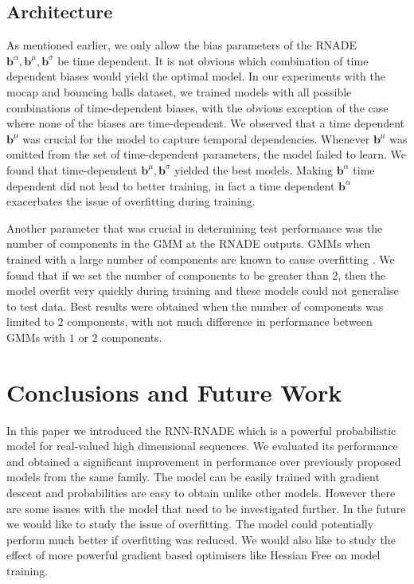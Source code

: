 \documentclass{article} %
\begin{document}
\subsection{Architecture}

As mentioned earlier, we only allow the bias parameters of the RNADE $\mathbf{b}^{\alpha},\mathbf{b}^{\mu},\mathbf{b}^{\sigma}$ be time dependent. It is not obvious which combination of time dependent biases would yield the optimal model. In our experiments with the mocap and bouncing balls dataset, we trained models with all possible combinations of time-dependent biases, with the obvious exception of the case where none of the biases are time-dependent. We observed that a time dependent $\mathbf{b}^{\mu}$ was crucial for the model to capture temporal dependencies. Whenever $\mathbf{b}^{\mu}$ was omitted from the set of time-dependent parameters, the model failed to learn. We found that time-dependent $\mathbf{b}^{\mu},\mathbf{b}^{\sigma}$ yielded the best models. Making $\mathbf{b}^{\alpha}$ time dependent did not lead to better training, in fact a time dependent $\mathbf{b}^{\alpha}$ exacerbates the issue of overfitting during training. 

Another parameter that was crucial in determining test performance was the number of components in the GMM at the RNADE outputs. GMMs when trained with a large number of components are known to cause overfitting \cite{bishop2006pattern}. We found that if we set the number of components to be greater than 2, then the model overfit very quickly during training and these models could not generalise to test data. Best results were obtained when the number of components was limited to $2$ components, with not much difference in performance between GMMs with $1$ or $2$ components.  

\section{Conclusions and Future Work}

In this paper we introduced the RNN-RNADE which is a powerful probabilistic model for real-valued high dimensional sequences. We evaluated its performance and obtained a significant improvement in performance over previously proposed models from the same family. The model can be easily trained with gradient descent and probabilities are easy to obtain unlike other models. However there are some issues with the model that need to be investigated further. In the future we would like to study the issue of overfitting. The model could potentially perform much better if overfitting was reduced. We would also like to study the effect of more powerful gradient based optimisers like Hessian Free on model training. 

\label{conclusion}



\end{document}
